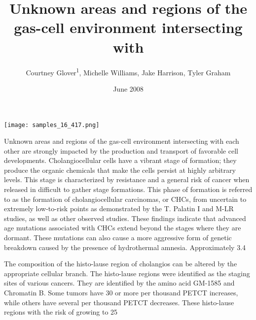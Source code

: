 \documentclass{article}
\title{Unknown areas and regions of the gas-cell environment intersecting with}
\author{Courtney Glover\textsuperscript{1},  Michelle Williams,  Jake Harrison,  Tyler Graham}
\affil{\textsuperscript{1}Oregon State University}
\date{June 2008}
\begin{document}
\maketitle

\begin{center}
\begin{minipage}{0.75\linewidth}
\texttt{[image: samples\_16\_417.png]}
\end{minipage}
\end{center}

Unknown areas and regions of the gas-cell environment intersecting with each other are strongly impacted by the production and transport of favorable cell developments. Cholangiocellular cells have a vibrant stage of formation; they produce the organic chemicals that make the cells persist at highly arbitrary levels. This stage is characterized by resistance and a general risk of cancer when released in difficult to gather stage formations. This phase of formation is referred to as the formation of cholangiocellular carcinomas, or CHCs, from uncertain to extremely low-to-risk points as demonstrated by the T. Palatin I and M-LR studies, as well as other observed studies. These findings indicate that advanced age mutations associated with CHCs extend beyond the stages where they are dormant. These mutations can also cause a more aggressive form of genetic breakdown caused by the presence of hydrothermal amnesia. Approximately 3.4%

The composition of the histo-lause region of cholangios can be altered by the appropriate cellular branch. The histo-lause regions were identified as the staging sites of various cancers. They are identified by the amino acid GM-1585 and Chromatin B. Some tumors have 30 or more per thousand PETCT increases, while others have several per thousand PETCT decreases. These histo-lause regions with the risk of growing to 25%
\end{document}
